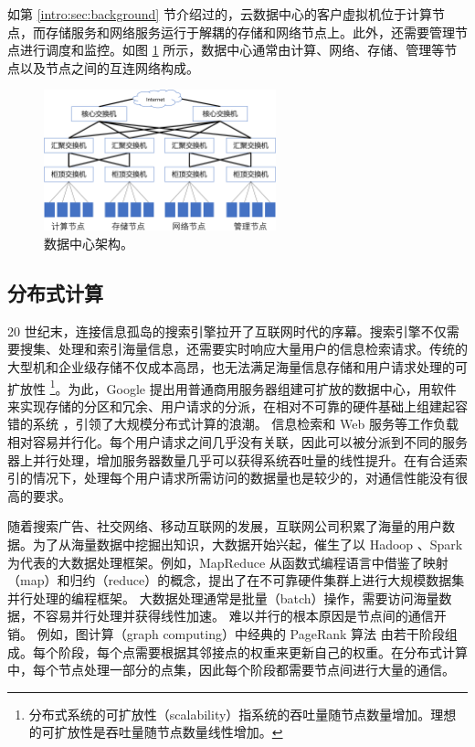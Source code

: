 如第 \ref{intro:sec:background} 节介绍过的，云数据中心的客户虚拟机位于计算节点，而存储服务和网络服务运行于解耦的存储和网络节点上。此外，还需要管理节点进行调度和监控。如图 \ref{background:fig:cloud-architecture} 所示，数据中心通常由计算、网络、存储、管理等节点以及节点之间的互连网络构成。



\begin{figure}[htbp]
	\centering
	\includegraphics[width=0.6\textwidth]{figures/DC_arch.pdf}
	\caption{数据中心架构。}
	\label{background:fig:cloud-architecture}
\end{figure}





\subsection{分布式计算}
\label{background:sec:datacenter-distributed}


20 世纪末，连接信息孤岛的搜索引擎拉开了互联网时代的序幕。搜索引擎不仅需要搜集、处理和索引海量信息，还需要实时响应大量用户的信息检索请求。传统的大型机和企业级存储不仅成本高昂，也无法满足海量信息存储和用户请求处理的可扩放性 \footnote{分布式系统的可扩放性（scalability）指系统的吞吐量随节点数量增加。理想的可扩放性是吞吐量随节点数量线性增加。}。为此，Google 提出用普通商用服务器组建可扩放的数据中心，用软件来实现存储的分区和冗余、用户请求的分派，在相对不可靠的硬件基础上组建起容错的系统 \cite{ghemawat2003google,chang2008bigtable,dean2008mapreduce}，引领了大规模分布式计算的浪潮。
信息检索和 Web 服务等工作负载相对容易并行化。每个用户请求之间几乎没有关联，因此可以被分派到不同的服务器上并行处理，增加服务器数量几乎可以获得系统吞吐量的线性提升。在有合适索引的情况下，处理每个用户请求所需访问的数据量也是较少的，对通信性能没有很高的要求。

随着搜索广告、社交网络、移动互联网的发展，互联网公司积累了海量的用户数据。为了从海量数据中挖掘出知识，大数据开始兴起，催生了以 Hadoop \cite{white2012hadoop}、Spark \cite{zaharia2010spark} 为代表的大数据处理框架。例如，MapReduce \cite{dean2008mapreduce} 从函数式编程语言中借鉴了映射（map）和归约（reduce）的概念，提出了在不可靠硬件集群上进行大规模数据集并行处理的编程框架。
大数据处理通常是批量（batch）操作，需要访问海量数据，不容易并行处理并获得线性加速。
难以并行的根本原因是节点间的通信开销。
例如，图计算（graph computing）中经典的 PageRank 算法 \cite{page1999pagerank} 由若干阶段组成。每个阶段，每个点需要根据其邻接点的权重来更新自己的权重。在分布式计算中，每个节点处理一部分的点集，因此每个阶段都需要节点间进行大量的通信。

